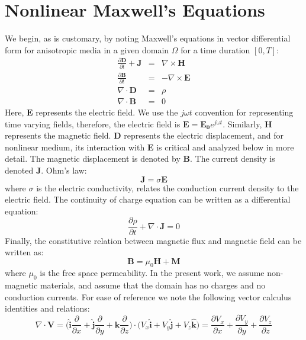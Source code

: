 \documentclass{article}[12pt]
\theoremstyle{plain}
\begin{document}
\section{Nonlinear Maxwell's Equations}
\label{section:nonlinear-maxwell}
We begin, as is customary, by noting Maxwell's equations in vector differential form for anisotropic media
in a given domain $\Omega$ for a time duration $[0,T]$:
\begin{eqnarray}
\frac{\partial \mathbf{D}}{\partial t} + \mathbf{J} & = & \nabla \times \mathbf{H} \label{eqn:mx1}\\
\frac{\partial \mathbf{B}}{\partial t} & = & - \nabla \times \mathbf{E} \label{eqn:mx2}\\
\nabla \cdot \mathbf{D} & = & \rho \label{eqn:mx3}\\
\nabla \cdot \mathbf{B} & = & 0 \label{eqn:mx4} 
\end{eqnarray}
Here, $\mathbf{E}$ represents the electric field. We use the $j\omega t$ convention for
representing time varying fields, therefore, the electric field is $\mathbf{E}=\mathbf{E_0}e^{j\omega t}$.
Similarly, $\mathbf{H}$ represents the magnetic field. $\mathbf{D}$ represents the electric
displacement, and for nonlinear medium, its interaction with $\mathbf{E}$ is critical and analyzed
below in more detail. The magnetic displacement is denoted by $\mathbf{B}$. The current density
is denoted $\mathbf{J}$. Ohm's law:
\[
\mathbf{J} = \sigma \mathbf{E}
\]
where $\sigma$ is the electric conductivity, relates the conduction current density to the electric
field. The continuity of charge equation can be written as a differential equation:
\[
\frac{\partial \rho}{\partial t} + \nabla \cdot \mathbf{J} = 0
\]
Finally, the constitutive relation between magnetic flux and magnetic field can be written as:
\[
\mathbf{B} = \mu_0 \mathbf{H} + \mathbf{M}
\]
where $\mu_0$ is the free space permeability.
In the present work, we assume non-magnetic materials, and assume that the domain has no charges and
no conduction currents.
For ease of reference we note the following vector calculus identities and relations:
\begin{equation}
\nabla \cdot \mathbf{V} = \Big( \hat{\mathbf{i}} \frac{\partial}{\partial x}
+ \hat{\mathbf{j}} \frac{\partial}{\partial y}
+ \hat{\mathbf{k}} \frac{\partial}{\partial z} \Big) \cdot
\Big( V_x\hat{\mathbf{i}} + V_y\hat{\mathbf{j}} + V_z\hat{\mathbf{k}}\Big) =
\frac{\partial V_x}{\partial x} + 
\frac{\partial V_y}{\partial y} + 
\frac{\partial V_z}{\partial z} 
\end{equation}
\end{document}
